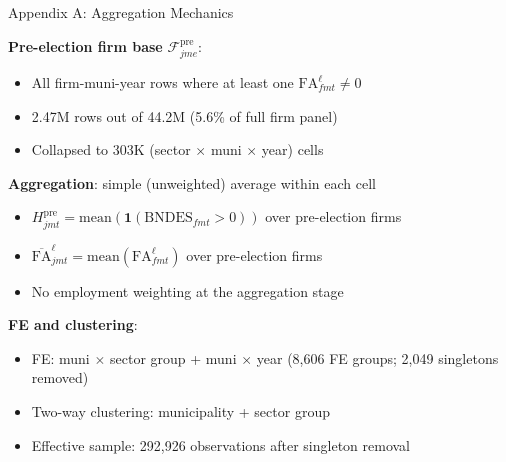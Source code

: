\documentclass[aspectratio=169,11pt]{beamer}
\newcommand{\FA}{\mathrm{FA}}
\begin{document}
\begin{frame}{Appendix A: Aggregation Mechanics}
\hypertarget{appendix:agg-mechanics}{}

\textbf{Pre-election firm base} $\mathcal{F}^{\mathrm{pre}}_{jme}$:
\begin{itemize}\setlength{\itemsep}{1pt}
    \item All firm-muni-year rows where at least one $\FA^\ell_{fmt} \neq 0$
    \item 2.47M rows out of 44.2M (5.6\% of full firm panel)
    \item Collapsed to 303K (sector $\times$ muni $\times$ year) cells
\end{itemize}

\medskip

\textbf{Aggregation}: simple (unweighted) average within each cell
\begin{itemize}\setlength{\itemsep}{1pt}
    \item $H^{\mathrm{pre}}_{jmt} = \text{mean}(\mathbf{1}(\text{BNDES}_{fmt} > 0))$ over pre-election firms
    \item $\overline{\FA}^\ell_{jmt} = \text{mean}(\FA^\ell_{fmt})$ over pre-election firms
    \item No employment weighting at the aggregation stage
\end{itemize}

\medskip

\textbf{FE and clustering}:
\begin{itemize}\setlength{\itemsep}{1pt}
    \item FE: muni $\times$ sector group + muni $\times$ year (8,606 FE groups; 2,049 singletons removed)
    \item Two-way clustering: municipality + sector group
    \item Effective sample: 292,926 observations after singleton removal
\end{itemize}

\end{frame}
\end{document}
